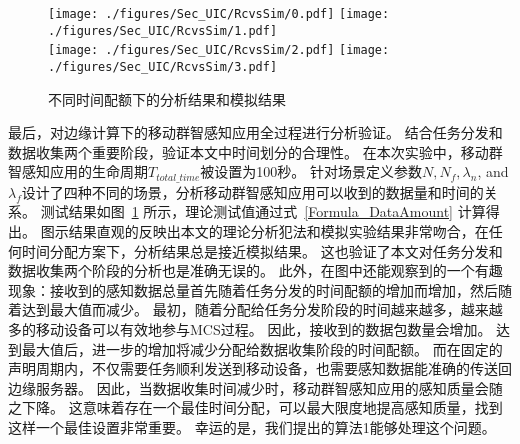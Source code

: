 
\begin{figure}[!b]
  \centering
  {\texttt{[image: ./figures/Sec\_UIC/RcvsSim/0.pdf]}}
  {\texttt{[image: ./figures/Sec\_UIC/RcvsSim/1.pdf]}}\\
  {\texttt{[image: ./figures/Sec\_UIC/RcvsSim/2.pdf]}}
  {\texttt{[image: ./figures/Sec\_UIC/RcvsSim/3.pdf]}}
  \vspace{-1em}
  \caption{不同时间配额下的分析结果和模拟结果}
  \label{Figure_EntireTest}
\end{figure}

最后，对边缘计算下的移动群智感知应用全过程进行分析验证。
结合任务分发和数据收集两个重要阶段，验证本文中时间划分的合理性。
在本次实验中，移动群智感知应用的生命周期$T_{total\_time}$被设置为100秒。
针对场景定义参数$N, N_f, \lambda_n$, and $\lambda_f$设计了四种不同的场景，分析移动群智感知应用可以收到的数据量和时间的关系。
测试结果如图~\ref{Figure_EntireTest} 所示，理论测试值通过式~\eqref{Formula_DataAmount} 计算得出。
图示结果直观的反映出本文的理论分析犯法和模拟实验结果非常吻合，在任何时间分配方案下，分析结果总是接近模拟结果。
这也验证了本文对任务分发和数据收集两个阶段的分析也是准确无误的。
此外，在图中还能观察到的一个有趣现象：接收到的感知数据总量首先随着任务分发的时间配额的增加而增加，然后随着达到最大值而减少。
最初，随着分配给任务分发阶段的时间越来越多，越来越多的移动设备可以有效地参与MCS过程。
因此，接收到的数据包数量会增加。
达到最大值后，进一步的增加将减少分配给数据收集阶段的时间配额。
而在固定的声明周期内，不仅需要任务顺利发送到移动设备，也需要感知数据能准确的传送回边缘服务器。
因此，当数据收集时间减少时，移动群智感知应用的感知质量会随之下降。
这意味着存在一个最佳时间分配，可以最大限度地提高感知质量，找到这样一个最佳设置非常重要。
幸运的是，我们提出的算法1能够处理这个问题。

